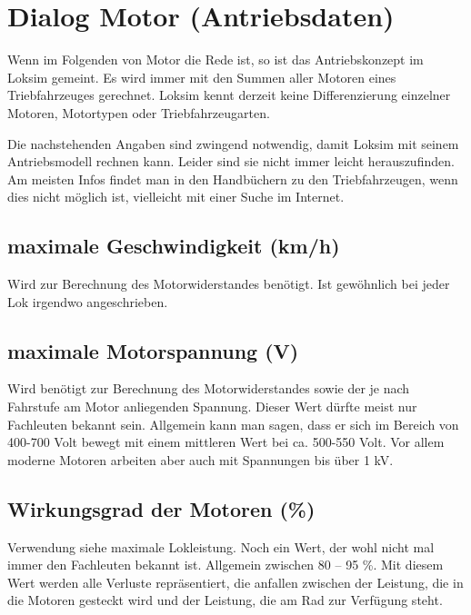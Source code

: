 \section{Dialog Motor (Antriebsdaten)}
Wenn im Folgenden von Motor die Rede ist, so ist das Antriebskonzept im Loksim gemeint. Es wird immer mit den Summen aller Motoren eines Triebfahrzeuges gerechnet. Loksim kennt derzeit keine Differenzierung einzelner Motoren, Motortypen oder Triebfahrzeugarten.

Die nachstehenden Angaben sind zwingend notwendig, damit Loksim mit seinem Antriebsmodell rechnen kann. Leider sind sie nicht immer leicht herauszufinden. Am meisten Infos findet man in den Handbüchern zu den Triebfahrzeugen, wenn dies nicht möglich ist, vielleicht mit einer Suche im Internet.

\subsection{maximale Geschwindigkeit (km/h)}
Wird zur Berechnung des Motorwiderstandes benötigt.
Ist gewöhnlich bei jeder Lok irgendwo angeschrieben.

\subsection{maximale Motorspannung (V)}
Wird benötigt zur Berechnung des Motorwiderstandes sowie der je nach Fahrstufe am Motor anliegenden Spannung.
Dieser Wert dürfte meist nur Fachleuten bekannt sein. Allgemein kann man sagen, dass er sich im Bereich von 400-700 Volt bewegt mit einem mittleren Wert bei ca. 500-550 Volt. Vor allem moderne Motoren arbeiten aber auch mit Spannungen bis über 1 kV.

\subsection{Wirkungsgrad der Motoren (\%)}
Verwendung siehe maximale Lokleistung.
Noch ein Wert, der wohl nicht mal immer den Fachleuten bekannt ist. Allgemein zwischen 80 – 95 \%.
Mit diesem Wert werden alle Verluste repräsentiert, die anfallen zwischen der Leistung, die in die Motoren gesteckt wird und der Leistung, die am Rad zur Verfügung steht.

